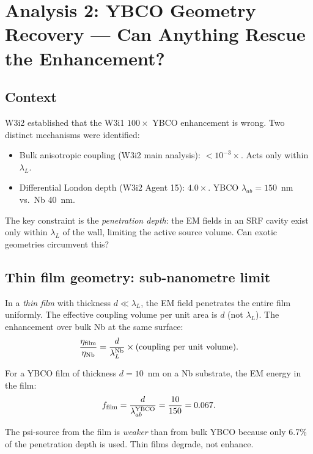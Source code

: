 \documentclass[11pt]{article}
\begin{document}
\section{Analysis 2: YBCO Geometry Recovery --- Can Anything Rescue the Enhancement?}
\label{sec:ybco-geometry}

\subsection{Context}

W3i2 established that the W3i1 $100\times$ YBCO enhancement is wrong. Two
distinct mechanisms were identified:
\begin{itemize}
\item Bulk anisotropic coupling (W3i2 main analysis): $< 10^{-3}\times$. Acts only
within $\lambda_L$.
\item Differential London depth (W3i2 Agent 15): $4.0\times$. YBCO $\lambda_{ab}
= 150$~nm vs.\ Nb 40~nm.
\end{itemize}

The key constraint is the \emph{penetration depth}: the EM fields in an SRF
cavity exist only within $\lambda_L$ of the wall, limiting the active source
volume. Can exotic geometries circumvent this?

\subsection{Thin film geometry: sub-nanometre limit}

In a \emph{thin film} with thickness $d \ll \lambda_L$, the EM field
penetrates the entire film uniformly. The effective coupling volume per unit
area is $d$ (not $\lambda_L$). The enhancement over bulk Nb at the same surface:
\begin{equation}
\frac{\eta_{\rm film}}{\eta_{\rm Nb}} = \frac{d}{\lambda_L^{\rm Nb}}
\times (\text{coupling per unit volume}).
\end{equation}

For a YBCO film of thickness $d = 10$~nm on a Nb substrate, the EM energy in
the film:
\begin{equation}
f_{\rm film} = \frac{d}{\lambda_{ab}^{\rm YBCO}} = \frac{10}{150} = 0.067.
\end{equation}

The psi-source from the film is \emph{weaker} than from bulk YBCO because
only 6.7\% of the penetration depth is used. Thin films degrade, not enhance.
\end{document}
